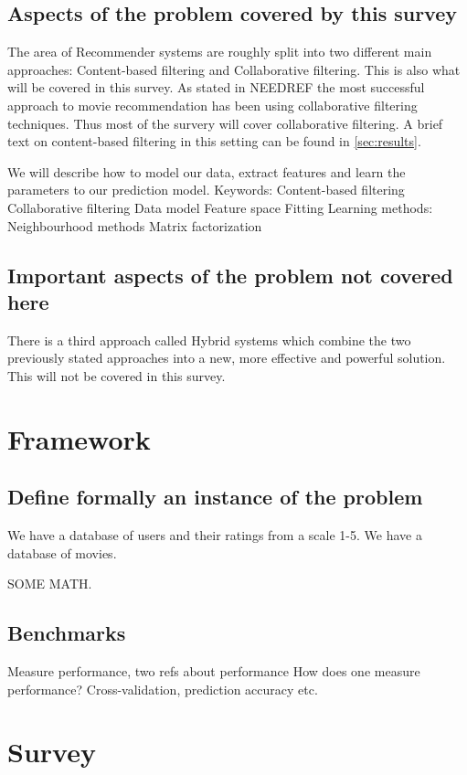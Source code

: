 \documentclass[a4paper,11pt]{report}
\begin{document}
\section{Aspects of the problem covered by this survey}
The area of Recommender systems are roughly split into two different main approaches: Content-based filtering and
Collaborative filtering. This is also what will be covered in this survey. As stated in NEEDREF the most successful
approach to movie recommendation has been using collaborative filtering techniques. Thus most of the survery will
cover collaborative filtering. A brief text on content-based filtering in this setting can be found in \ref{sec:results}.

We will describe how to model our data, extract features and learn the parameters to our prediction model.
Keywords:
Content-based filtering
Collaborative filtering
Data model
Feature space
Fitting
Learning methods:
  Neighbourhood methods
  Matrix factorization

\section{Important aspects of the problem not covered here}
There is a third approach called Hybrid systems which combine the two previously stated approaches into a new,
more effective and powerful solution. This will not be covered in this survey.

\chapter{Framework}

\section{Define formally an instance of the problem}
We have a database of users and their ratings from a scale 1-5.
We have a database of movies.

SOME MATH.

\section{Benchmarks}
Measure performance, two refs about performance
How does one measure performance? Cross-validation, prediction accuracy etc.

\chapter{Survey}
\end{document}
